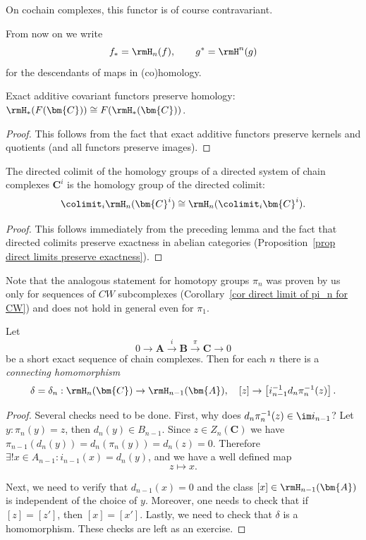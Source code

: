 \begin{rem}
    On cochain complexes, this functor is of course contravariant.
\end{rem}

From now on we write
\[f_\ast=\rmH_n(f),\quad\quad g^\ast=\rmH^n(g)\]
for the descendants of maps in (co)homology.

\begin{lem}
    Exact additive covariant functors preserve homology: $\rmH_\ast(F(\bm{C}))\cong F(\rmH_\ast(\bm{C}))$.
\end{lem}
\begin{proof}
    This follows from the fact that exact additive functors preserve kernels and quotients (and all functors preserve images).
\end{proof}

\begin{prop}
    The directed colimit of the homology groups of a directed system of chain complexes $\bm{C}^i$ is the homology group  of the directed colimit:
    \[\colimit_i \rmH_n(\bm{C}^i)\cong \rmH_n(\colimit_i \bm{C}^i).\]
\end{prop}
\begin{proof}
    This follows immediately from the preceding lemma and the fact that directed colimits preserve exactness in abelian categories (Proposition~\ref{prop direct limits preserve exactness}).
\end{proof}
\begin{rem}
    Note that the analogous statement for homotopy groups $\pi_n$ was proven by us only for sequences of $CW$ subcomplexes (Corollary~\ref{cor direct limit of pi_n for CW}) and does not hold in general even for $\pi_1$.
\end{rem}



\begin{thm}\label{connecting hom in homology}
    Let 
    \[0\to \bm{A}\overset i\to \bm{B}\overset\pi\to \bm{C}\to 0 \]
    be a short exact sequence of chain complexes. Then for each $n$ there is a \emph{connecting homomorphism}
    \[\delta=\delta_n:\rmH_n(\bm{C})\to \rmH_{n-1}(\bm{A}),\quad [z]\to \left[i_{n-1}^{-1} d_n\pi_n^{-1}(z)\right].\]
\end{thm}
\begin{proof}
    Several checks need to be done. First, why does $d_n\pi_n^{-1}(z)\in\im i_{n-1}$? Let $y:\pi_n(y)=z$, then $d_n(y)\in B_{n-1}$. Since $z\in Z_n(\bm{C})$ we have $\pi_{n-1}(d_n(y))=d_n(\pi_n(y))=d_n(z)=0$. Therefore $\exists ! x\in A_{n-1}:i_{n-1}(x)=d_n(y)$, and we have a well defined map
    \[z\mapsto x.\]
    
    Next, we need to verify that $d_{n-1}(x)=0$ and the class $[x]\in \rmH_{n-1}(\bm{A})$ is independent of the choice of $y$.
    Moreover, one needs to check that if $[z]=[z']$, then $[x]=[x']$. Lastly, we need to check that $\delta$ is a homomorphism. These checks are left as an exercise.
\end{proof}

